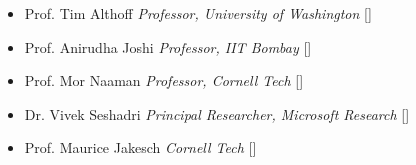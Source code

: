 \vspace{3mm}
\begin{itemize}
    \item Prof. Tim Althoff \dotfill \emph{Professor, University of Washington} [\href{https://homes.cs.washington.edu/~althoff/}{\small{\websiteSymbol}}]
    \item Prof. Anirudha Joshi \dotfill \emph{Professor, IIT Bombay} [\href{http://www.idc.iitb.ac.in/~anirudha/}{\small{\websiteSymbol}}]
    \item Prof. Mor Naaman \dotfill \emph{Professor, Cornell Tech} [\href{https://tech.cornell.edu/people/mor-naaman/}{\small{\websiteSymbol}}]
    \item Dr. Vivek Seshadri \dotfill \emph{Principal Researcher, Microsoft Research} [\href{https://www.microsoft.com/en-us/research/people/visesha/}{\small{\websiteSymbol}}]
    \item Prof. Maurice Jakesch \dotfill \emph{Cornell Tech} [\href{https://mauricejakesch.com/}{\small{\websiteSymbol}}]
\end{itemize}
